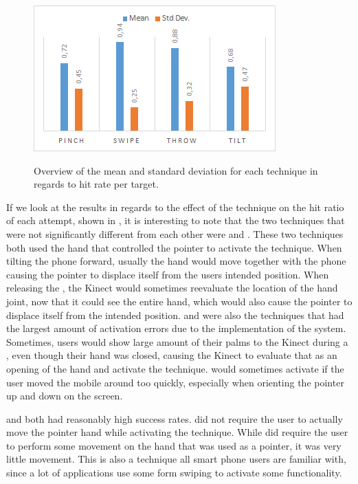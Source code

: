 \begin{figure}[H]
	{\includegraphics[width = 1\columnwidth ]{images/techHitResults.png}} 
	\caption{
		Overview of the mean and standard deviation for each technique in regards to hit rate per target.
	}
	\label{fig:gridhitResults}
\end{figure}

If we look at the results in regards to the effect of the technique on the hit ratio of each attempt, shown in , it is interesting to note that the two techniques that were not significantly different from each other were \tilt and \pinch. These two techniques both used the hand that controlled the pointer to activate the technique. When tilting the phone forward, usually the hand would move together with the phone causing the pointer to displace itself from the users intended position. When releasing the \pinch, the Kinect would sometimes reevaluate the location of the hand joint, now that it could see the entire hand, which would also cause the pointer to displace itself from the intended position. \pinch and \tilt were also the techniques that had the largest amount of activation errors due to the implementation of the system. Sometimes, users would show large amount of their palms to the Kinect during a \pinch, even though their hand was closed, causing the Kinect to evaluate that as an opening of the hand and activate the technique. \tilt would sometimes activate if the user moved the mobile around too quickly, especially when orienting the pointer up and down on the screen.  

\swipe and \throw both had reasonably high success rates. \throw did not require the user to actually move the pointer hand while activating the technique. While \swipe did require the user to perform some movement on the hand that was used as a pointer, it was very little movement. This is also a technique all smart phone users are familiar with, since a lot of applications use some form swiping to activate some functionality.

